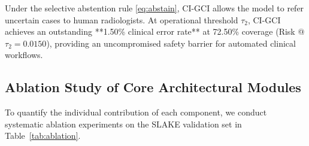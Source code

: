 \documentclass[journal,twoside,web]{ieeecolor}
\begin{document}
Under the selective abstention rule \eqref{eq:abstain}, CI-GCI allows the model to refer uncertain cases to human radiologists. At operational threshold $\tau_2$, CI-GCI achieves an outstanding **1.50\% clinical error rate** at 72.50\% coverage (Risk @ $\tau_2 = 0.0150$), providing an uncompromised safety barrier for automated clinical workflows.

\subsection{Ablation Study of Core Architectural Modules}
To quantify the individual contribution of each component, we conduct systematic ablation experiments on the SLAKE validation set in Table~\ref{tab:ablation}.

\begin{table}[t]
\caption{Ablation Study of Core Modules}
\label{tab:ablation}
\centering
\setlength{\tabcolsep}{3pt}
\end{table}
\end{document}

